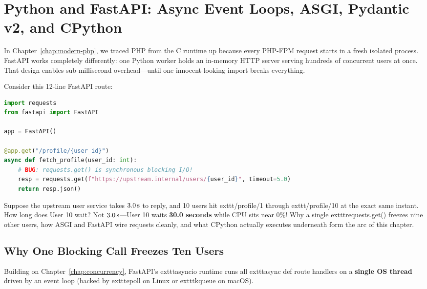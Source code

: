 \chapter{Python and FastAPI: Async Event Loops, ASGI, Pydantic v2, and CPython}
\label{chap:python-fastapi}

In Chapter~\ref{chap:modern-php}, we traced PHP from the C runtime up because every PHP-FPM request starts in a fresh isolated process. FastAPI works completely differently: one Python worker holds an in-memory HTTP server serving hundreds of concurrent users at once. That design enables sub-millisecond overhead---until one innocent-looking import breaks everything.

Consider this 12-line FastAPI route:

\begin{lstlisting}[language=Python,caption={The Classic 	exttt{async def} Event-Loop Freeze Bug}]
import requests
from fastapi import FastAPI

app = FastAPI()

@app.get("/profile/{user_id}")
async def fetch_profile(user_id: int):
    # BUG: requests.get() is synchronous blocking I/O!
    resp = requests.get(f"https://upstream.internal/users/{user_id}", timeout=5.0)
    return resp.json()
\end{lstlisting}

Suppose the upstream user service takes $3.0\text{\,s}$ to reply, and 10 users hit 	exttt{/profile/1} through 	exttt{/profile/10} at the exact same instant. How long does User 10 wait? Not $3.0\text{\,s}$---User 10 waits \textbf{30.0 seconds} while CPU sits near $0\%$! Why a single 	exttt{requests.get()} freezes nine other users, how ASGI and FastAPI wire requests cleanly, and what CPython actually executes underneath form the arc of this chapter.

\section{Why One Blocking Call Freezes Ten Users}

Building on Chapter~\ref{chap:concurrency}, FastAPI's 	exttt{asyncio} runtime runs all 	exttt{async def} route handlers on a \textbf{single OS thread} driven by an event loop (backed by 	exttt{epoll} on Linux or 	exttt{kqueue} on macOS).

